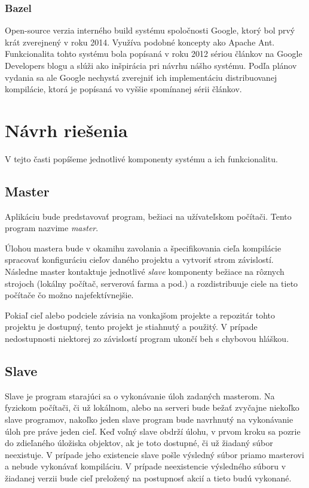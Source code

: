 \subsubsection{Bazel}
Open-source verzia interného build systému spoločnosti Google, ktorý bol prvý krát
zverejnený v roku 2014. Využíva podobné koncepty ako Apache Ant. Funkcionalita tohto
systému bola popísaná v roku 2012 sériou článkov na Google Developers blogu
\cite{BlazeDesign} a slúži ako inšpirácia pri návrhu nášho systému. Podľa plánov
vydania \cite{BazelRoadmap} sa ale Google nechystá zverejniť ich implementáciu
distribuovanej kompilácie, ktorá je popísaná vo vyššie spomínanej sérii článkov.

\section{N\'{a}vrh rie\v{s}enia}
\label{sec:solution}
V tejto časti popíšeme jednotlivé komponenty systému a ich funkcionalitu.

\subsection{Master}
\label{sub:solution:master}
Aplikáciu bude predstavovať program, bežiaci na užívateľskom počítači. Tento program
nazvime {\it master}.

Úlohou mastera bude v okamihu zavolania a špecifikovania cieľa kompilácie spracovať
konfiguráciu cieľov daného projektu a vytvoriť strom závislostí. Následne master
kontaktuje jednotlivé {\it slave} \/komponenty bežiace na rôznych strojoch (lokálny
počítač, serverová farma a pod.) a rozdistribuuje ciele na tieto počítače čo možno
najefektívnejšie.

Pokiaľ cieľ alebo podciele závisia na vonkajšom projekte a repozitár tohto projektu
je dostupný, tento projekt je stiahnutý a použitý. V prípade nedostupnosti niektorej
zo závislostí program ukončí beh s chybovou hláškou.

\subsection{Slave}
\label{sub:solution:slave}
Slave je program starajúci sa o vykonávanie úloh zadaných masterom. Na fyzickom počítači,
či už lokálnom, alebo na serveri bude bežať zvyčajne niekoľko slave programov, nakoľko
jeden slave program bude navrhnutý na vykonávanie úloh pre práve jeden cieľ. Keď voľný
slave obdrží úlohu, v prvom kroku sa pozrie do zdieľaného úložiska objektov, ak je
toto dostupné, či už žiadaný súbor neexistuje. V prípade jeho existencie slave
pošle výsledný súbor priamo masterovi a nebude vykonávať kompiláciu. V prípade
neexistencie výsledného súboru v žiadanej verzii bude cieľ preložený na postupnosť
akcií a tieto budú vykonané.


